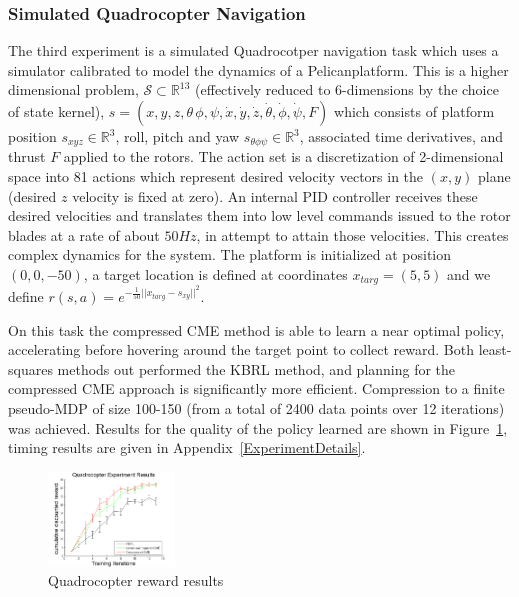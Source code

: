 \documentclass[letterpaper]{article}
\newcommand{\cS}{{\mathcal S}}
\newcommand{\R}{{\mathbb R}}
\begin{document}
\subsubsection{Simulated Quadrocopter Navigation}

The third experiment is a simulated Quadrocotper navigation task which uses a simulator \citep{denardi2013rn} calibrated to model the dynamics of a Pelican\texttrademark  platform. This is a higher dimensional problem, $\cS\subset\R^{13}$ (effectively reduced to 6-dimensions by the choice of state kernel), $s=(x,y,z,\theta\,\phi,\psi,\dot{x},\dot{y},\dot{z},\dot{\theta},\dot{\phi},\dot{\psi},F)$ which consists of platform position $s_{xyz}\in\R^3$, roll, pitch and yaw $s_{\theta\phi\psi}\in\R^3$, associated time derivatives, and thrust $F$ applied to the rotors. The action set is a discretization of 2-dimensional space into 81 actions which represent desired velocity vectors in the $(x,y)$ plane (desired $z$ velocity is fixed at zero). An internal PID controller receives these desired velocities and translates them into low level commands issued to the rotor blades at a rate of about $50Hz$, in attempt to attain those velocities. This creates complex dynamics for the system. The platform is initialized at position $(0,0,-50)$, a target location is defined at coordinates $x_{targ} = (5,5)$ and we define $r(s,a)=e^{-\frac{1}{50}||x_{targ}-s_{xy}||^{2}}$.

On this task the compressed CME method is able to learn a near optimal policy, accelerating before hovering around the target point to collect reward. Both least-squares methods out performed the KBRL method, and planning for the compressed CME approach is significantly more efficient. Compression to a finite pseudo-MDP of size 100-150 (from a total of 2400 data points over 12 iterations) was achieved. Results for the quality of the policy learned are shown in Figure~\ref{QuadRwdfigs}, timing results are given in Appendix~\ref{ExperimentDetails}.

\begin{figure}[htb]
\centering
\includegraphics[width=0.3\textwidth]{Quadrewards.png}
\caption{Quadrocopter reward results}
\label{QuadRwdfigs}
\end{figure}
\end{document}
